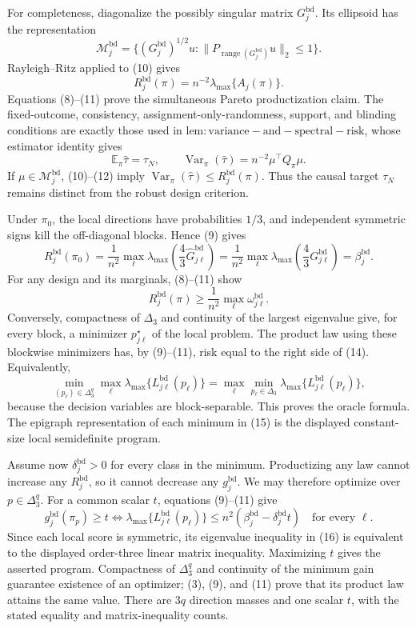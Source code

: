 For completeness, diagonalize the possibly singular matrix \(G_j^{\mathrm{bd}}\).  Its ellipsoid has the representation
\[
\mathcal M_j^{\mathrm{bd}}
=\{(G_j^{\mathrm{bd}})^{1/2}u:\|P_{\operatorname{range}(G_j^{\mathrm{bd}})}u\|_2\le1\}.
\tag{10}
\]
Rayleigh--Ritz applied to (10) gives
\[
R_j^{\mathrm{bd}}(\pi)
=n^{-2}\lambda_{\max}\{A_j(\pi)\}.
\tag{11}
\]
Equations (8)--(11) prove the simultaneous Pareto productization claim.  The fixed-outcome, consistency, assignment-only-randomness, support, and blinding conditions are exactly those used in \(\mathrm{lem:variance-and-spectral-risk}\), whose estimator identity gives
\[
\mathbb E_\pi\widehat\tau=\tau_N,
\qquad
\operatorname{Var}_\pi(\widehat\tau)=n^{-2}\mu^\top Q_\pi\mu.
\tag{12}
\]
If \(\mu\in\mathcal M_j^{\mathrm{bd}}\), (10)--(12) imply \(\operatorname{Var}_\pi(\widehat\tau)\le R_j^{\mathrm{bd}}(\pi)\).  Thus the causal target \(\tau_N\) remains distinct from the robust design criterion.

Under \(\pi_0\), the local directions have probabilities \(1/3\), and independent symmetric signs kill the off-diagonal blocks. Hence (9) gives
\[
R_j^{\mathrm{bd}}(\pi_0)
=\frac1{n^2}\max_\ell
\lambda_{\max}\!\left(\frac43\widehat G^{\mathrm{bd}}_{j\ell}\right)
=\frac1{n^2}\max_\ell
\lambda_{\max}\!\left(\frac43G^{\mathrm{bd}}_{j\ell}\right)
=\beta_j^{\mathrm{bd}}.
\tag{13}
\]
For any design and its marginals, (8)--(11) show
\[
R_j^{\mathrm{bd}}(\pi)
\ge\frac1{n^2}\max_\ell\omega^{\mathrm{bd}}_{j\ell}.
\tag{14}
\]
Conversely, compactness of \(\Delta_3\) and continuity of the largest eigenvalue give, for every block, a minimizer \(p_{j\ell}^\star\) of the local problem.  The product law using these blockwise minimizers has, by (9)--(11), risk equal to the right side of (14).  Equivalently,
\[
\min_{(p_\ell)\in\Delta_3^q}
\max_\ell\lambda_{\max}\{L^{\mathrm{bd}}_{j\ell}(p_\ell)\}
=\max_\ell\min_{p_\ell\in\Delta_3}
\lambda_{\max}\{L^{\mathrm{bd}}_{j\ell}(p_\ell)\},
\tag{15}
\]
because the decision variables are block-separable.  This proves the oracle formula.  The epigraph representation of each minimum in (15) is the displayed constant-size local semidefinite program.

Assume now \(\delta_j^{\mathrm{bd}}>0\) for every class in the minimum.  Productizing any law cannot increase any \(R_j^{\mathrm{bd}}\), so it cannot decrease any \(g_j^{\mathrm{bd}}\).  We may therefore optimize over \(p\in\Delta_3^q\).  For a common scalar \(t\), equations (9)--(11) give
\[
g_j^{\mathrm{bd}}(\pi_p)\ge t
\iff
\lambda_{\max}\{L^{\mathrm{bd}}_{j\ell}(p_\ell)\}
\le n^2(\beta_j^{\mathrm{bd}}-\delta_j^{\mathrm{bd}}t)
\quad\text{for every }\ell.
\tag{16}
\]
Since each local score is symmetric, its eigenvalue inequality in (16) is equivalent to the displayed order-three linear matrix inequality.  Maximizing \(t\) gives the asserted program.  Compactness of \(\Delta_3^q\) and continuity of the minimum gain guarantee existence of an optimizer; (3), (9), and (11) prove that its product law attains the same value.  There are \(3q\) direction masses and one scalar \(t\), with the stated equality and matrix-inequality counts.

